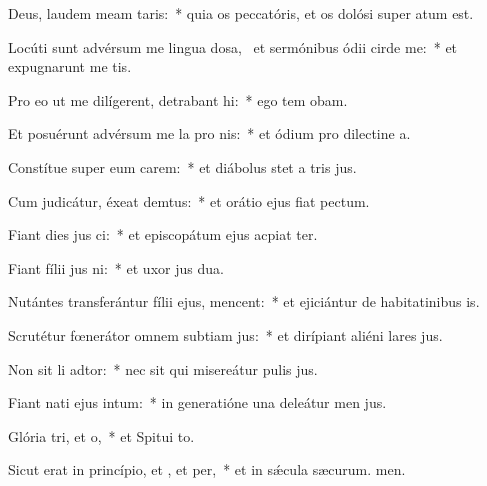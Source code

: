 \item Deus, laudem meam  taris:~* quia os peccatóris, et os dolósi super  atum est.
\item Locúti sunt advérsum me lingua dosa,~\pscross{} et sermónibus ódii cirde me:~* et expugnarunt me tis.
\item Pro eo ut me dilígerent, detrabant hi:~* ego tem obam.
\item Et posuérunt advérsum me la pro nis:~* et ódium pro dilectine a.
\item Constítue super eum carem:~* et diábolus stet a tris jus.
\item Cum judicátur, éxeat demtus:~* et orátio ejus fiat  pectum.
\item Fiant dies jus ci:~* et episcopátum ejus acpiat ter.
\item Fiant fílii jus ni:~* et uxor jus dua.
\item Nutántes transferántur fílii ejus,  mencent:~* et ejiciántur de habitatinibus is.
\item Scrutétur fœnerátor omnem subtiam jus:~* et dirípiant aliéni lares jus.
\item Non sit li adtor:~* nec sit qui misereátur pulis jus.
\item Fiant nati ejus  intum:~* in generatióne una deleátur men jus.
\item Glória tri, et o,~* et Spitui to.
\item Sicut erat in princípio, et , et per,~* et in sǽcula sæcurum. men.
